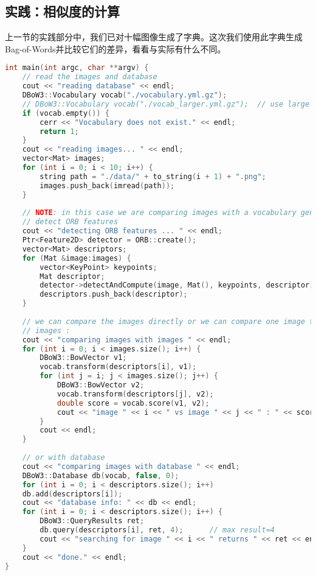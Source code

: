 \subsection{实践：相似度的计算}
上一节的实践部分中，我们已对十幅图像生成了字典。这次我们使用此字典生成Bag-of-Words并比较它们的差异，看看与实际有什么不同。

\begin{lstlisting}[language=c++,caption=slambook/ch12/loop\_closure.cpp]
int main(int argc, char **argv) {
	// read the images and database  
	cout << "reading database" << endl;
	DBoW3::Vocabulary vocab("./vocabulary.yml.gz");
	// DBoW3::Vocabulary vocab("./vocab_larger.yml.gz");  // use large vocab if you want: 
	if (vocab.empty()) {
		cerr << "Vocabulary does not exist." << endl;
		return 1;
	}
	cout << "reading images... " << endl;
	vector<Mat> images;
	for (int i = 0; i < 10; i++) {
		string path = "./data/" + to_string(i + 1) + ".png";
		images.push_back(imread(path));
	}
	
	// NOTE: in this case we are comparing images with a vocabulary generated by themselves, this may lead to overfit.
	// detect ORB features
	cout << "detecting ORB features ... " << endl;
	Ptr<Feature2D> detector = ORB::create();
	vector<Mat> descriptors;
	for (Mat &image:images) {
		vector<KeyPoint> keypoints;
		Mat descriptor;
		detector->detectAndCompute(image, Mat(), keypoints, descriptor);
		descriptors.push_back(descriptor);
	}
	
	// we can compare the images directly or we can compare one image to a database 
	// images :
	cout << "comparing images with images " << endl;
	for (int i = 0; i < images.size(); i++) {
		DBoW3::BowVector v1;
		vocab.transform(descriptors[i], v1);
		for (int j = i; j < images.size(); j++) {
			DBoW3::BowVector v2;
			vocab.transform(descriptors[j], v2);
			double score = vocab.score(v1, v2);
			cout << "image " << i << " vs image " << j << " : " << score << endl;
		}
		cout << endl;
	}
	
	// or with database 
	cout << "comparing images with database " << endl;
	DBoW3::Database db(vocab, false, 0);
	for (int i = 0; i < descriptors.size(); i++)
	db.add(descriptors[i]);
	cout << "database info: " << db << endl;
	for (int i = 0; i < descriptors.size(); i++) {
		DBoW3::QueryResults ret;
		db.query(descriptors[i], ret, 4);      // max result=4
		cout << "searching for image " << i << " returns " << ret << endl << endl;
	}
	cout << "done." << endl;
}
\end{lstlisting}

